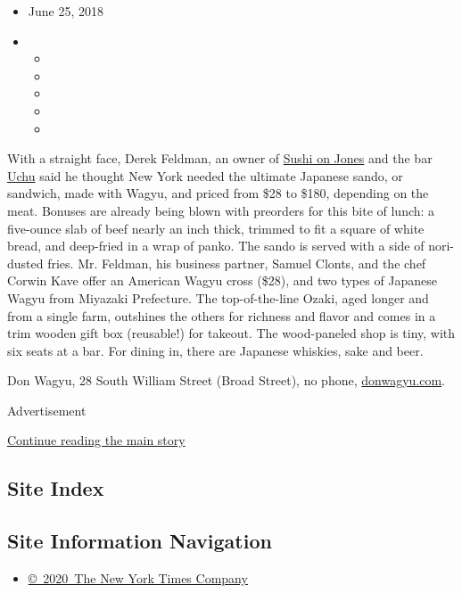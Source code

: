 \begin{itemize}
\item
  June 25, 2018
\item
  \begin{itemize}
  \item
  \item
  \item
  \item
  \item
  \end{itemize}
\end{itemize}

With a straight face, Derek Feldman, an owner of
\href{https://www.nytimes3xbfgragh.onion/2016/10/26/dining/sushi-on-jones-review.html}{Sushi
on Jones} and the bar \href{http://uchu.nyc/}{Uchu} said he thought New
York needed the ultimate Japanese sando, or sandwich, made with Wagyu,
and priced from \$28 to \$180, depending on the meat. Bonuses are
already being blown with preorders for this bite of lunch: a five-ounce
slab of beef nearly an inch thick, trimmed to fit a square of white
bread, and deep-fried in a wrap of panko. The sando is served with a
side of nori-dusted fries. Mr. Feldman, his business partner, Samuel
Clonts, and the chef Corwin Kave offer an American Wagyu cross (\$28),
and two types of Japanese Wagyu from Miyazaki Prefecture. The
top-of-the-line Ozaki, aged longer and from a single farm, outshines the
others for richness and flavor and comes in a trim wooden gift box
(reusable!) for takeout. The wood-paneled shop is tiny, with six seats
at a bar. For dining in, there are Japanese whiskies, sake and beer.

Don Wagyu, 28 South William Street (Broad Street), no phone,
\href{http://donwagyu.com}{donwagyu.com}.

Advertisement

\protect\hyperlink{after-bottom}{Continue reading the main story}

\hypertarget{site-index}{%
\subsection{Site Index}\label{site-index}}

\hypertarget{site-information-navigation}{%
\subsection{Site Information
Navigation}\label{site-information-navigation}}

\begin{itemize}
\tightlist
\item
  \href{https://help.nytimes3xbfgragh.onion/hc/en-us/articles/115014792127-Copyright-notice}{©~2020~The
  New York Times Company}
\end{itemize}

